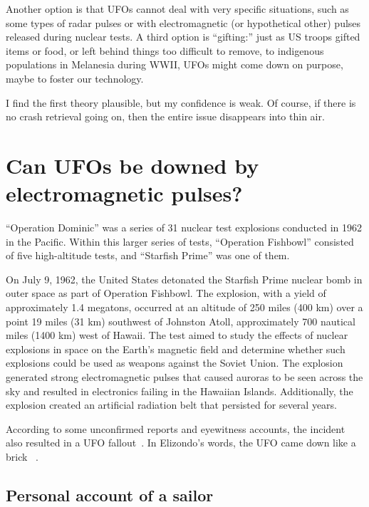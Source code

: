 Another option is that UFOs cannot deal with very specific situations, such as some types of radar pulses or with electromagnetic (or hypothetical other) pulses released during nuclear tests. A third option is ``gifting:'' just as US troops gifted items or food, or left behind things too difficult to remove, to indigenous populations in Melanesia during WWII, UFOs might come down on purpose, maybe to foster our technology.

I find the first theory plausible, but my confidence is weak. Of course, if there is no crash retrieval going on, then the entire issue disappears into thin air.

\section{Can UFOs be downed by electromagnetic pulses?}
\label{2023-UFO-part-Perception-crash-retreivals-htdau}

``Operation Dominic'' was a series of 31 nuclear test explosions conducted in 1962 in the Pacific.
Within this larger series of tests, ``Operation Fishbowl'' consisted of five high-altitude tests, and ``Starfish Prime''
was one of them.

On July 9, 1962, the United States detonated the Starfish Prime nuclear bomb in outer space as part of Operation Fishbowl.
The explosion, with a yield of approximately 1.4 megatons, occurred at an altitude of 250 miles (400 km) over a point 19 miles (31 km)
southwest of Johnston Atoll, approximately 700 nautical miles (1400 km) west of Hawaii.
The test aimed to study the effects of nuclear explosions in space on the Earth's magnetic field and determine
whether such explosions could be used as weapons against the Soviet Union.
The explosion generated strong electromagnetic pulses
that caused auroras to be seen across the sky and resulted in electronics failing in the Hawaiian Islands.
Additionally, the explosion created an artificial radiation belt that persisted for several years.

According to some unconfirmed reports and eyewitness accounts, the incident also resulted in a UFO fallout~\cite[Chapter~BDM - EMP, pp.~64f]{Omega_Point2022Nov}.
In Elizondo's words, the UFO came down like a brick ~\cite[time=38 min 44 sec]{Iandoli-Elizondo-Starfish-prime}.

\subsection{Personal account of a sailor}

